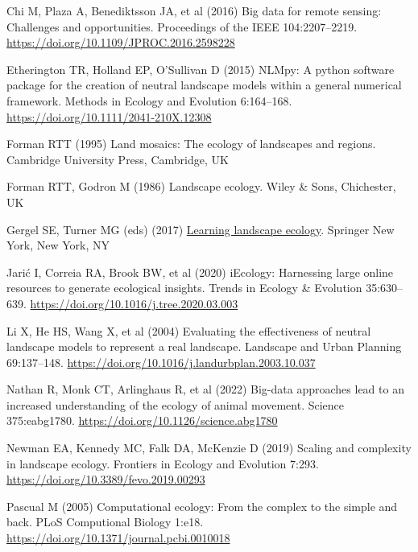 \documentclass[
  12pt,
  a4paperpaper,
]{article}
\newlength{\cslhangindent}
\newenvironment{CSLReferences}[2] %
 {\begin{list}{}{%
  \setlength{\itemindent}{0pt}
  \setlength{\leftmargin}{0pt}
  \setlength{\parsep}{0pt}
  \ifodd #1
   \setlength{\leftmargin}{\cslhangindent}
   \setlength{\itemindent}{-1\cslhangindent}
  \fi
  \setlength{\itemsep}{#2\baselineskip}}}
 {\end{list}}
\begin{document}
\label{refs}
\begin{CSLReferences}{1}{1}
Chi M, Plaza A, Benediktsson JA, et al (2016) Big data for remote
sensing: Challenges and opportunities. Proceedings of the IEEE
104:2207--2219. \url{https://doi.org/10.1109/JPROC.2016.2598228}

Etherington TR, Holland EP, O'Sullivan D (2015) NLMpy: A python software
package for the creation of neutral landscape models within a general
numerical framework. Methods in Ecology and Evolution 6:164--168.
\url{https://doi.org/10.1111/2041-210X.12308}

Forman RTT (1995) Land mosaics: The ecology of landscapes and regions.
Cambridge University Press, Cambridge, UK

Forman RTT, Godron M (1986) Landscape ecology. Wiley \& Sons,
Chichester, UK

Gergel SE, Turner MG (eds) (2017)
\href{https://doi.org/10.1007/978-1-4939-6374-4}{Learning landscape
ecology}. Springer New York, New York, NY

Jarić I, Correia RA, Brook BW, et al (2020) iEcology: Harnessing large
online resources to generate ecological insights. Trends in Ecology \&
Evolution 35:630--639. \url{https://doi.org/10.1016/j.tree.2020.03.003}

Li X, He HS, Wang X, et al (2004) Evaluating the effectiveness of
neutral landscape models to represent a real landscape. Landscape and
Urban Planning 69:137--148.
\url{https://doi.org/10.1016/j.landurbplan.2003.10.037}

Nathan R, Monk CT, Arlinghaus R, et al (2022) Big-data approaches lead
to an increased understanding of the ecology of animal movement. Science
375:eabg1780. \url{https://doi.org/10.1126/science.abg1780}

Newman EA, Kennedy MC, Falk DA, McKenzie D (2019) Scaling and complexity
in landscape ecology. Frontiers in Ecology and Evolution 7:293.
\url{https://doi.org/10.3389/fevo.2019.00293}

Pascual M (2005) Computational ecology: From the complex to the simple
and back. PLoS Computional Biology 1:e18.
\url{https://doi.org/10.1371/journal.pcbi.0010018}


\end{CSLReferences}
\end{document}

